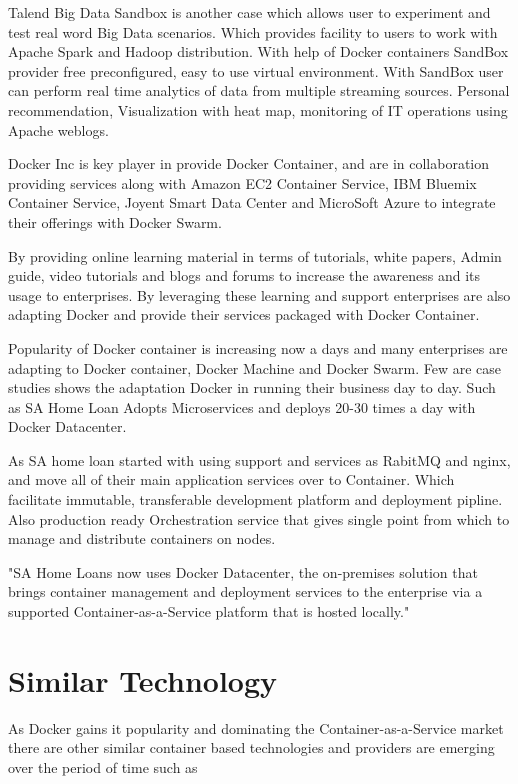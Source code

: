 \documentclass[9pt,twocolumn,twoside]{styles/osajnl}
\begin{document}
Talend Big Data Sandbox is another case which allows user to experiment and test real word Big Data scenarios. Which provides facility to users to work with Apache Spark and Hadoop distribution. With help of Docker containers SandBox provider free preconfigured, easy to use virtual environment. With SandBox user can perform real time analytics of data from multiple streaming sources. Personal recommendation, Visualization with heat map, monitoring of IT operations using Apache weblogs.\cite{SandBox}

Docker Inc is key player in provide Docker Container, and are in collaboration providing services along with Amazon EC2 Container Service, IBM Bluemix Container Service, Joyent Smart Data Center and MicroSoft Azure to integrate their offerings with Docker Swarm.

By providing online learning material in terms of tutorials, white papers, Admin guide, video tutorials and blogs and forums to increase the awareness and its usage to enterprises. By leveraging these learning and support enterprises are also adapting Docker and provide their services packaged with Docker Container. 

Popularity of Docker container is increasing now a days and many enterprises are adapting to Docker container, Docker Machine and Docker Swarm. Few are case studies shows the adaptation Docker in running their business day to day. Such as SA Home Loan Adopts Microservices and deploys 20-30 times a day with Docker Datacenter.

As SA home loan started with using support and services as RabitMQ and nginx, and move all of their main application services over to Container. Which facilitate immutable, transferable development platform and deployment pipline. Also production ready Orchestration service that gives single point from which to manage and distribute containers on nodes.

"SA Home Loans now uses Docker Datacenter, the on-premises solution that brings container management and deployment services to the enterprise via a supported Container-as-a-Service platform that is hosted locally."
\cite{SA}

\section{Similar Technology}
As Docker gains it popularity and dominating the Container-as-a-Service market there are other similar container based technologies and providers are emerging over the period of time such as
\end{document}
